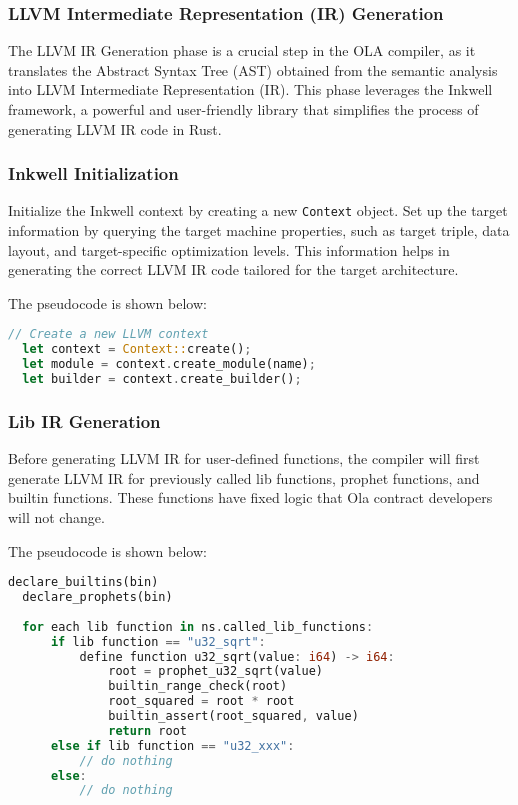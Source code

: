 \subsubsection{LLVM Intermediate Representation (IR) Generation}

The LLVM IR Generation phase is a crucial step in the OLA compiler, as it translates the Abstract Syntax Tree (AST) obtained from the semantic analysis into LLVM Intermediate Representation (IR). This phase leverages the Inkwell framework, a powerful and user-friendly library that simplifies the process of generating LLVM IR code in Rust.

\subsubsection*{Inkwell Initialization}

Initialize the Inkwell context by creating a new \texttt{Context} object. Set up the target information by querying the target machine properties, such as target triple, data layout, and target-specific optimization levels. This information helps in generating the correct LLVM IR code tailored for the target architecture.

The pseudocode is shown below:

\begin{lstlisting}[language=Rust]
  // Create a new LLVM context
  let context = Context::create();
  let module = context.create_module(name);
  let builder = context.create_builder();
\end{lstlisting}
\subsubsection*{Lib IR Generation}

Before generating LLVM IR for user-defined functions, the compiler will first generate LLVM IR for previously called lib functions, prophet functions, and builtin functions. These functions have fixed logic that Ola contract developers will not change.

The pseudocode is shown below:

\begin{lstlisting}[language=Rust]
  declare_builtins(bin)
  declare_prophets(bin)
  
  for each lib function in ns.called_lib_functions:
      if lib function == "u32_sqrt":
          define function u32_sqrt(value: i64) -> i64:
              root = prophet_u32_sqrt(value)
              builtin_range_check(root)
              root_squared = root * root
              builtin_assert(root_squared, value)
              return root
      else if lib function == "u32_xxx":
          // do nothing
      else:
          // do nothing
  
\end{lstlisting}
